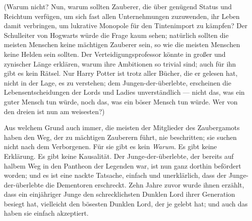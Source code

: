 (Warum nicht? Nun, warum sollten Zauberer, die über genügend Status und Reichtum verfügen, um sich fast allen Unternehmungen zuzuwenden, ihr Leben damit verbringen, um lukrative Monopole für den Tintenimport zu kämpfen? Der Schulleiter von Hogwarts würde die Frage kaum sehen; natürlich sollten die meisten Menschen keine mächtigen Zauberer sein, so wie die meisten Menschen keine Helden sein sollten. Der Verteidigungsprofessor könnte in großer und zynischer Länge erklären, warum ihre Ambitionen so trivial sind; auch für ihn gibt es kein Rätsel. Nur Harry Potter ist trotz aller Bücher, die er gelesen hat, nicht in der Lage, es zu verstehen; dem Jungen-der-überlebte, erscheinen die Lebensentscheidungen der Lords und Ladies unverständlich — nicht das, was ein guter Mensch tun würde, noch das, was ein böser Mensch tun würde. Wer von den dreien ist nun am weisesten?)

Aus welchem Grund auch immer, die meisten der Mitglieder des Zaubergamots haben den Weg, der zu mächtigen Zauberern führt, nie beschritten; sie suchen nicht nach dem Verborgenen. Für sie gibt es kein \emph{Warum}. Es gibt keine Erklärung. Es gibt keine Kausalität. Der Junge-der-überlebte, der bereits auf halbem Weg in den Pantheon der Legenden war, ist nun ganz dorthin befördert worden; und es ist eine nackte Tatsache, einfach und unerklärlich, dass der Junge-der-überlebte die Dementoren erschreckt. Zehn Jahre zuvor wurde ihnen erzählt, dass ein einjähriger Junge den schrecklichsten Dunklen Lord ihrer Generation besiegt hat, vielleicht den bösesten Dunklen Lord, der je gelebt hat; und auch das haben sie einfach akzeptiert.

